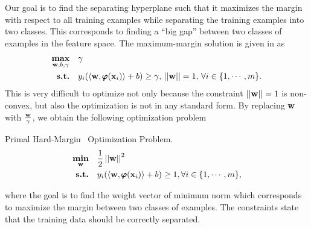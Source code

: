{Our goal is to find the separating hyperplane such that it maximizes the margin with respect to all training examples while separating the training examples into two classes.
This corresponds to finding a ``big gap'' between two classes of examples in the feature space.
The maximum-margin solution is given in \citep{Bishop07} as
\begin{align*}
	\underset{\mathbf {w},b,\gamma}{\textbf{max}} &\quad \gamma\\
	\textbf{s.t.} &\quad y_i(\langle \mathbf {w}, \pmb \varphi(\mathbf {x}_i) \rangle+b) \ge \gamma, \, \left|\left| \mathbf {w} \right|\right|=1, \, \forall i\in\{1,\cdots,m\}.
\end{align*}
This is very difficult to optimize not only because the constraint $\left|\left| \mathbf {w} \right|\right|=1$ is non-convex, but also the optimization is not in any standard form.
By replacing $\mathbf {w}$ with $\frac{\mathbf {w}}{\gamma}$, we obtain the following optimization problem

\begin{definition}{Primal Hard-Margin \svm\ Optimization Problem.}\label{hardsvmprimal}
	\begin{align*}
		\underset{\mathbf {w}}{\textbf{min}} & \quad\frac{1}{2}\left|\left| \mathbf {w} \right|\right|^2\\
		\textbf{s.t.} & \quad y_i(\langle \mathbf {w}, \pmb \varphi(\mathbf {x}_i) \rangle + b) \ge 1, \forall i\in\{1,\cdots,m\},
	\end{align*}
\end{definition}
\noindent
where the goal is to find the weight vector of minimum norm which corresponds to maximize the margin between two classes of examples.
The constraints state that the training data should be correctly separated.

}
